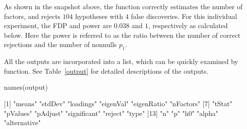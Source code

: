 As shown in the snapshot above, the function  correctly estimates the number of factors, and rejects $104$ hypotheses with $4$ false discoveries. For this individual experiment, the FDP and power are $0.038$ and $1$, respectively as calculated below. Here the power is referred to as the ratio between the number of correct rejections and the number of nonnulls $p_1$.








All the outputs are incorporated into a list, which can be quickly examined by  function. See Table~\ref{output} for detailed descriptions of the outputs. %

\begin{example*}
names(output)

 [1] "means"       "stdDev"      "loadings"    "eigenVal"    "eigenRatio"  "nFactors"   
 [7] "tStat"       "pValues"     "pAdjust"     "significant" "reject"      "type"
[13] "n"           "p"           "h0"          "alpha"       "alternative"
\end{example*}


